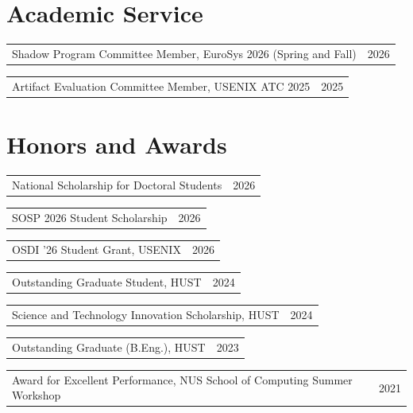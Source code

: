 \documentclass[a4paper,11pt]{article}
\makeatletter
\newcommand{\datedentry}[2]{%
  \begin{tabular*}{\textwidth}{@{\extracolsep{\fill}}lr}
    #1 & #2
  \end{tabular*}%
}
\makeatother
\begin{document}
\section{Academic Service}

\datedentry
  {Shadow Program Committee Member, EuroSys 2026 (Spring and Fall)}
  {2026}
\vspace{0.24em}
\datedentry
  {Artifact Evaluation Committee Member, USENIX ATC 2025}
  {2025}

\section{Honors and Awards}

\datedentry
  {National Scholarship for Doctoral Students}
  {2026}
\vspace{0.20em}
\datedentry
  {SOSP 2026 Student Scholarship}
  {2026}
\vspace{0.20em}
\datedentry
  {OSDI '26 Student Grant, USENIX}
  {2026}
\vspace{0.20em}
\datedentry
  {Outstanding Graduate Student, HUST}
  {2024}
\vspace{0.20em}
\datedentry
  {Science and Technology Innovation Scholarship, HUST}
  {2024}
\vspace{0.20em}
\datedentry
  {Outstanding Graduate (B.Eng.), HUST}
  {2023}
\vspace{0.20em}
\datedentry
  {Award for Excellent Performance, NUS School of Computing Summer Workshop}
  {2021}
\end{document}
